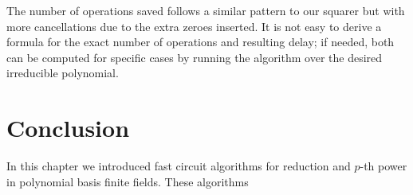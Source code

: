 The number of operations saved follows a similar pattern to our squarer but with more cancellations due to the extra zeroes inserted. It is not easy to derive a formula for the exact number of operations and resulting delay; if needed, both can be computed for specific cases by running the algorithm over the desired irreducible polynomial.

\section{Conclusion}

In this chapter we introduced fast circuit algorithms for reduction and $p$-th power in polynomial basis finite fields. These algorithms 

